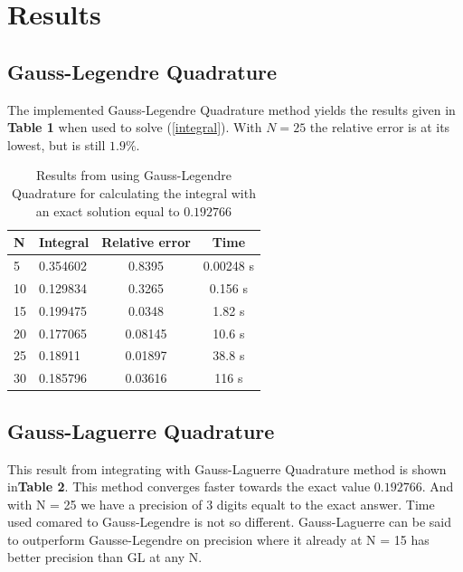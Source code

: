 \documentclass[twoside,twocolumn]{article}
\begin{document}

\section{Results}


\subsection{Gauss-Legendre Quadrature}
The implemented Gauss-Legendre Quadrature method yields the results given in \textbf{Table 1} when used to solve (\ref{integral}). With $N=25$ the relative error is at its lowest, but is still $1.9 \%$. 




\begin{table}[h]
\centering
\begin{tabular}{|l|l|c|c|}
\hline
N  & Integral & \multicolumn{1}{l|}{Relative error} & Time      \\ \hline
5  & 0.354602 & 0.8395                              & 0.00248 s \\ \hline
10 & 0.129834 & 0.3265                              & 0.156 s   \\ \hline
15 & 0.199475 & 0.0348                              & 1.82 s    \\ \hline
20 & 0.177065 & 0.08145                             & 10.6 s    \\ \hline
25 & 0.18911  & 0.01897                             & 38.8 s    \\ \hline
30 & 0.185796 & 0.03616                             & 116 s     \\ \hline
\end{tabular}
\caption{Results from using Gauss-Legendre Quadrature for calculating the integral with an exact solution equal to $0.192766$}
\end{table}


\subsection{Gauss-Laguerre Quadrature}
This result from integrating with Gauss-Laguerre Quadrature method is shown in\textbf{Table 2}. This method converges faster towards the exact value  $0.192766$. And with N = 25 we have a precision of 3 digits equalt to the exact answer. Time used comared to Gauss-Legendre is not so different. Gauss-Laguerre can be said to outperform Gausse-Legendre on precision where it already at N = 15 has better precision than GL at any N.
\end{document}

